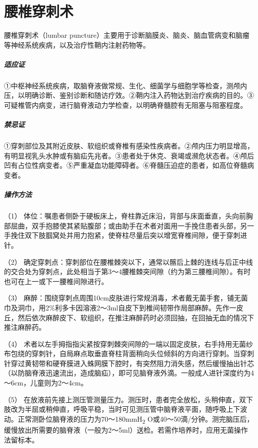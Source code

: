 \protect\hypertarget{text00378.html}{}{}

\section{腰椎穿刺术}

腰椎穿刺术（lumbar
puncture）主要用于诊断脑膜炎、脑炎、脑血管病变和脑瘤等神经系统疾病，以及治疗性鞘内注射药物等。

\subparagraph{适应证}

①中枢神经系统疾病，取脑脊液做常规、生化、细菌学与细胞学等检查，测颅内压，以明确诊断、鉴别诊断和随访疗效。②鞘内注入药物达到治疗疾病的目的。③可疑椎管内病变，进行脑脊液动力学检查，以明确脊髓腔有无阻塞与阻塞程度。

\subparagraph{禁忌证}

①穿刺部位及其附近皮肤、软组织或脊椎有感染性疾病者。②颅内压力明显增高，有明显视乳头水肿或有脑疝先兆者。③患者处于休克、衰竭或濒危状态者。④颅后凹有占位性病变者。⑤严重凝血功能障碍者。⑥脊髓压迫症的患者，如高位脊髓病变者。

\subparagraph{操作方法}

（1）
体位：嘱患者侧卧于硬板床上，脊柱靠近床沿，背部与床面垂直，头向前胸部屈曲，双手抱膝使其紧贴腹部；或由助手在术者对面用一手挽住患者头部，另一手挽住双下肢腘窝处并用力抱紧，使脊柱尽量后突以增宽脊椎间隙，便于穿刺进针。

（2）
确定穿刺点：穿刺部位在腰椎棘突以下，通常以髂后上棘的连线与后正中线的交合处为穿刺点，此处相当于第3～4腰椎棘突间隙（约为第三腰椎间隙）。有时也可在上一或下一腰椎间隙进行。

（3）
麻醉：围绕穿刺点周围10cm皮肤进行常规消毒，术者戴无菌手套，铺无菌巾及洞巾，用2\%利多卡因溶液2～3ml自皮下到椎间韧带作局部麻醉。先作一皮丘，然后依次麻醉皮下、软组织，在推注麻醉药时必须回抽，在回抽无血的情况下推注麻醉药。

（4）
术者以左手拇指指尖紧按穿刺棘突间隙的一端以固定皮肤，右手持用无菌纱布包绕的穿刺针，自局麻点取垂直脊柱背面稍向头位倾斜的方向进行穿刺。当穿刺针穿过黄韧带和硬脊膜进入蛛网膜下腔时，有突然阻力消失感，然后缓慢抽出针芯（以防脑脊液迅速流出，造成脑疝），即可见脑脊液外滴。一般成人进针深度约为4～6cm，儿童则为2～4cm。

（5）
在放液前先接上测压管测量压力。测压时，患者完全放松，头稍伸直，双下肢改为半屈或稍伸直，呼吸平稳，当时可见测压管中脑脊液平面，随呼吸上下波动。正常测卧位脑脊液的压力为70～180mmH\textsubscript{2}
O或40～50滴/分钟。测完脑压后，缓慢放出所需要的脑脊液（一般为2～5ml）送检。若需作培养时，应用无菌操作法留标本。

